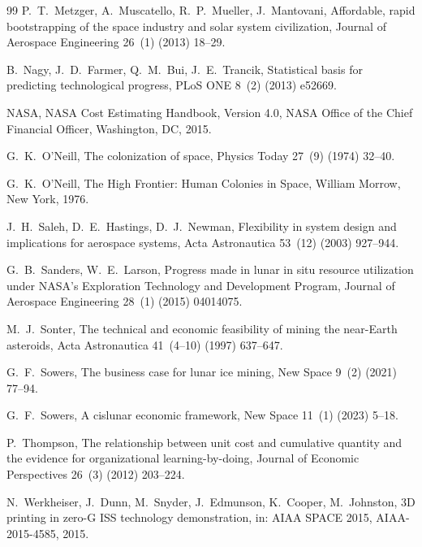 \documentclass[preprint,12pt]{elsarticle}
\begin{document}
\begin{thebibliography}{99}
P.~T.~Metzger, A.~Muscatello, R.~P.~Mueller, J.~Mantovani,
\newblock Affordable, rapid bootstrapping of the space industry and solar system civilization,
\newblock Journal of Aerospace Engineering 26~(1) (2013) 18--29.

B.~Nagy, J.~D.~Farmer, Q.~M.~Bui, J.~E.~Trancik,
\newblock Statistical basis for predicting technological progress,
\newblock PLoS ONE 8~(2) (2013) e52669.

NASA,
\newblock NASA Cost Estimating Handbook, Version 4.0,
\newblock NASA Office of the Chief Financial Officer, Washington, DC, 2015.

G.~K.~O'Neill,
\newblock The colonization of space,
\newblock Physics Today 27~(9) (1974) 32--40.

G.~K.~O'Neill,
\newblock The High Frontier: Human Colonies in Space,
\newblock William Morrow, New York, 1976.

J.~H.~Saleh, D.~E.~Hastings, D.~J.~Newman,
\newblock Flexibility in system design and implications for aerospace systems,
\newblock Acta Astronautica 53~(12) (2003) 927--944.

G.~B.~Sanders, W.~E.~Larson,
\newblock Progress made in lunar in situ resource utilization under NASA's Exploration Technology and Development Program,
\newblock Journal of Aerospace Engineering 28~(1) (2015) 04014075.

M.~J.~Sonter,
\newblock The technical and economic feasibility of mining the near-Earth asteroids,
\newblock Acta Astronautica 41~(4--10) (1997) 637--647.

G.~F.~Sowers,
\newblock The business case for lunar ice mining,
\newblock New Space 9~(2) (2021) 77--94.

G.~F.~Sowers,
\newblock A cislunar economic framework,
\newblock New Space 11~(1) (2023) 5--18.

P.~Thompson,
\newblock The relationship between unit cost and cumulative quantity and the evidence for organizational learning-by-doing,
\newblock Journal of Economic Perspectives 26~(3) (2012) 203--224.

N.~Werkheiser, J.~Dunn, M.~Snyder, J.~Edmunson, K.~Cooper, M.~Johnston,
\newblock 3D printing in zero-G ISS technology demonstration,
\newblock in: AIAA SPACE 2015, AIAA-2015-4585, 2015.


\end{thebibliography}
\end{document}
